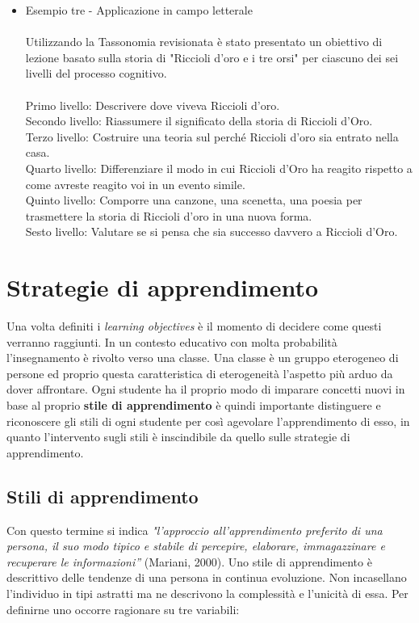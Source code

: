 \begin{itemize}
\item Esempio tre - Applicazione in campo letterale\\
\\
Utilizzando la Tassonomia revisionata è stato presentato un obiettivo di lezione basato sulla storia di "Riccioli d'oro e i tre orsi" per ciascuno dei sei livelli del processo cognitivo.\\
\\
Primo livello: Descrivere dove viveva Riccioli d'oro.\\
Secondo livello: Riassumere il significato della storia di Riccioli d'Oro.\\
Terzo livello: Costruire una teoria sul perché Riccioli d'oro sia entrato nella casa.\\
Quarto livello: Differenziare il modo in cui Riccioli d'Oro ha reagito rispetto a come avreste reagito voi in un evento simile.\\
Quinto livello: Comporre una canzone, una scenetta, una poesia per trasmettere la storia di Riccioli d'oro in una nuova forma.\\
Sesto livello: Valutare se si pensa che sia successo davvero a Riccioli d'Oro.
\end{itemize}
\section{Strategie di apprendimento}
\label{sec:problem}

Una volta definiti i \textit{learning objectives} è il momento di decidere come questi verranno raggiunti. In un contesto educativo con molta probabilità l'insegnamento è rivolto verso una classe. Una classe è un gruppo eterogeneo di persone ed proprio questa caratteristica di eterogeneità l'aspetto più arduo da dover affrontare. Ogni studente ha il proprio modo di imparare concetti nuovi in base al proprio \textbf{stile di apprendimento} è quindi importante distinguere e riconoscere gli stili di ogni studente per così agevolare l'apprendimento di esso, in quanto l'intervento sugli stili è inscindibile da quello sulle strategie di apprendimento.

\subsection{Stili di apprendimento}
Con questo termine si indica \textit{"l'approccio all’apprendimento preferito di una persona, il suo modo tipico e stabile di percepire, elaborare, immagazzinare e recuperare le informazioni”} (Mariani, 2000).
Uno stile di apprendimento è descrittivo delle tendenze di una persona in continua evoluzione. Non incasellano l'individuo in tipi astratti ma ne descrivono la complessità e l'unicità di essa. Per definirne uno occorre ragionare su tre variabili:

